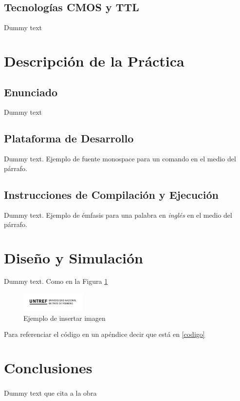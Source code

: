 \documentclass{article}
\let\originalcite\cite
\renewcommand{\cite}[2][]{\textsuperscript{\originalcite{#2}}}
\begin{document}
\subsection*{Tecnologías CMOS y TTL}
Dummy text

\section*{Descripción de la Práctica}

\subsection*{Enunciado}
Dummy text

\subsection*{Plataforma de Desarrollo}
Dummy text. Ejemplo de fuente monospace {\ttfamily para un comando} en el medio del párrafo.

\subsection*{Instrucciones de Compilación y Ejecución}
Dummy text. Ejemplo de émfasis para una palabra en \textit{inglés} en el medio del párrafo.

\section*{Diseño y Simulación}
Dummy text. Como en la Figura \ref{imagen}

\begin{figure}[h]
    \centering
    \includegraphics[height=1cm]{logo.png}
    \caption{Ejemplo de insertar imagen}
    \label{imagen}
\end{figure}
\clearpage 

Para referenciar el código en un apéndice decir que está en \ref{codigo}

\section*{Conclusiones}
Dummy text que cita a la obra \cite{boylestad}
\end{document}
